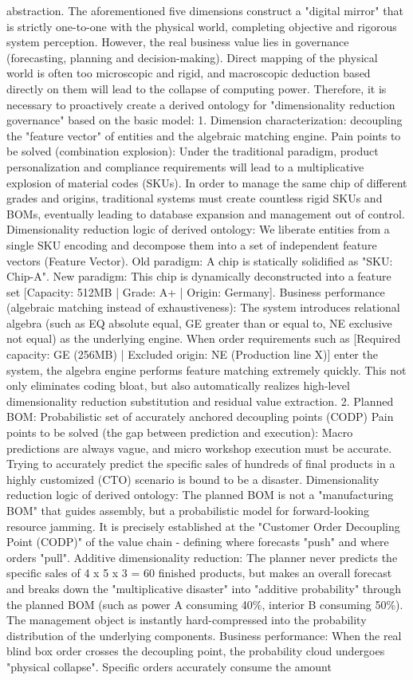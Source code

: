 \documentclass[11pt,a4paper]{article}
\begin{document}
abstraction. The aforementioned five dimensions construct a "digital mirror" that is strictly one-to-one with the physical world, completing objective and rigorous system perception. However, the real business value lies in governance (forecasting, planning and decision-making). Direct mapping of the physical world is often too microscopic and rigid, and macroscopic deduction based directly on them will lead to the collapse of computing power. Therefore, it is necessary to proactively create a derived ontology for "dimensionality reduction governance" based on the basic model: 1. Dimension characterization: decoupling the "feature vector" of entities and the algebraic matching engine. Pain points to be solved (combination explosion): Under the traditional paradigm, product personalization and compliance requirements will lead to a multiplicative explosion of material codes (SKUs). In order to manage the same chip of different grades and origins, traditional systems must create countless rigid SKUs and BOMs, eventually leading to database expansion and management out of control. Dimensionality reduction logic of derived ontology: We liberate entities from a single SKU encoding and decompose them into a set of independent feature vectors (Feature Vector). Old paradigm: A chip is statically solidified as "SKU: Chip-A". New paradigm: This chip is dynamically deconstructed into a feature set [Capacity: 512MB | Grade: A+ | Origin: Germany]. Business performance (algebraic matching instead of exhaustiveness): The system introduces relational algebra (such as EQ absolute equal, GE greater than or equal to, NE exclusive not equal) as the underlying engine. When order requirements such as [Required capacity: GE (256MB) | Excluded origin: NE (Production line X)] enter the system, the algebra engine performs feature matching extremely quickly. This not only eliminates coding bloat, but also automatically realizes high-level dimensionality reduction substitution and residual value extraction. 2. Planned BOM: Probabilistic set of accurately anchored decoupling points (CODP) Pain points to be solved (the gap between prediction and execution): Macro predictions are always vague, and micro workshop execution must be accurate. Trying to accurately predict the specific sales of hundreds of final products in a highly customized (CTO) scenario is bound to be a disaster. Dimensionality reduction logic of derived ontology: The planned BOM is not a "manufacturing BOM" that guides assembly, but a probabilistic model for forward-looking resource jamming. It is precisely established at the "Customer Order Decoupling Point (CODP)" of the value chain - defining where forecasts "push" and where orders "pull". Additive dimensionality reduction: The planner never predicts the specific sales of 4 x 5 x 3 = 60 finished products, but makes an overall forecast and breaks down the "multiplicative disaster" into "additive probability" through the planned BOM (such as power A consuming 40\%, interior B consuming 50\%). The management object is instantly hard-compressed into the probability distribution of the underlying components. Business performance: When the real blind box order crosses the decoupling point, the probability cloud undergoes "physical collapse". Specific orders accurately consume the amount 
\end{document}
